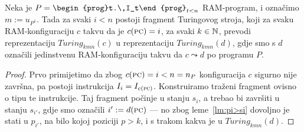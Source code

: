 \begin{propozicija}\label{prop:gadgets}
Neka je $P=\begin{prog}t.\,I_t\end{prog}_{t<n}$ RAM-program, i označimo $m:=u_{P^1}$. Tada za svaki $i<n$ postoji fragment Turingovog stroja, koji za svaku RAM-konfiguraciju $c$ takvu da je $c(\textsc{pc})=i$, za svaki $k\in{\mathbb N}$, prevodi reprezentaciju $Turing_{kmn}(c)$ u reprezentaciju $Turing_{kmn}(d)$, gdje smo s $d$ označili jedinstvenu RAM-konfiguraciju takvu da $c\leadsto d$ po programu $P$.
\end{propozicija}
\begin{proof}
Prvo primijetimo da zbog $c(\textsc{pc})=i<n=n_P$ konfiguracija $c$ sigurno nije završna, pa postoji instrukcija $I_i=I_{c(\textsc{pc})}$. Konstruiramo traženi fragment ovisno o tipu te instrukcije. Taj fragment počinje u stanju $s_i$, a trebao bi završiti u stanju $s_{i'}$, gdje smo označili $i':=d(\textsc{pc})$ --- no zbog leme~\ref{lm:pi>si} dovoljno je stati u $p_{i'}$, na bilo kojoj poziciji $p>k$, i s trakom kakva je u $Turing_{kmn}(d)$.


\end{proof}
